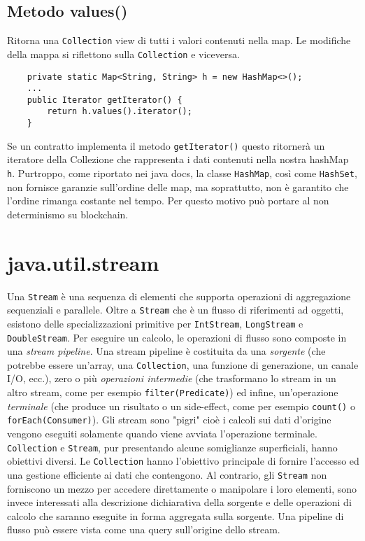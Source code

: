 		\subsection{Metodo values()}
			Ritorna una \lstinline|Collection| view di tutti i valori contenuti nella map. Le modifiche della mappa si riflettono sulla  \lstinline|Collection| e viceversa.
			\begin{lstlisting}
	private static Map<String, String> h = new HashMap<>();
	...
	public Iterator getIterator() { 
		return h.values().iterator();
	}
			\end{lstlisting}
			Se un contratto implementa il metodo \lstinline|getIterator()| questo ritornerà un iteratore della Collezione che rappresenta i dati contenuti nella nostra hashMap \lstinline|h|. Purtroppo, come riportato nei java docs, la classe \lstinline|HashMap|, così come \lstinline|HashSet|, non fornisce garanzie sull'ordine delle map, ma soprattutto, non è garantito che l'ordine rimanga costante nel tempo. Per questo motivo può portare al non determinismo su blockchain.
			
	\section{java.util.stream}
		Una \lstinline|Stream| è una sequenza di elementi che supporta operazioni di aggregazione sequenziali e parallele. Oltre a \lstinline|Stream| che è un flusso di riferimenti ad oggetti, esistono delle specializzazioni primitive per \lstinline|IntStream|, \lstinline|LongStream| e \lstinline|DoubleStream|. Per eseguire un calcolo, le operazioni di flusso sono composte in una \textit{stream pipeline}. Una stream pipeline è costituita da una \textit{sorgente} (che potrebbe essere un'array, una \lstinline|Collection|, una funzione di generazione, un canale I/O, ecc.), zero o più \textit{operazioni intermedie} (che trasformano lo stream in un altro stream, come per esempio \lstinline|filter(Predicate)|) ed infine, un'operazione \textit{terminale} (che produce un risultato o un side-effect, come per esempio \lstinline|count()| o \lstinline|forEach(Consumer)|). Gli stream sono "pigri" cioè i calcoli sui dati d'origine vengono eseguiti solamente quando viene avviata l'operazione terminale.
		\lstinline|Collection| e \lstinline|Stream|, pur presentando alcune somiglianze superficiali, hanno obiettivi diversi. Le \lstinline|Collection| hanno l'obiettivo principale di fornire l'accesso ed una gestione efficiente ai dati che contengono. Al contrario, gli \lstinline|Stream| non forniscono un mezzo per accedere direttamente o manipolare i loro elementi, sono invece interessati alla descrizione dichiarativa della sorgente e delle operazioni di calcolo che saranno eseguite in forma aggregata sulla sorgente.	Una pipeline di flusso può essere vista come una query sull'origine dello stream.
		
